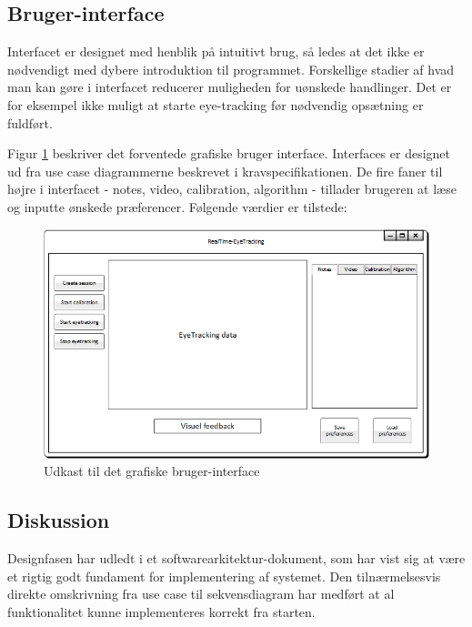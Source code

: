 \documentclass[rapport.tex]{subfiles}
\begin{document}
	\subsection{Bruger-interface}
	Interfacet er designet med henblik på intuitivt brug, så ledes at det ikke er nødvendigt med dybere introduktion til programmet. Forskellige stadier af hvad man kan gøre i interfacet reducerer muligheden for uønskede handlinger. Det er for eksempel ikke muligt at starte eye-tracking før nødvendig opsætning er fuldført. 
	
	Figur \ref{fig:FrameworkUdkastSimpel} beskriver det forventede grafiske bruger interface. Interfaces er designet ud fra use case diagrammerne beskrevet i kravspecifikationen.
	De fire faner til højre i interfacet - notes, video, calibration, algorithm - tillader brugeren at læse og inputte ønskede præferencer. Følgende værdier er tilstede:
	
	
	\begin{figure}
		\centering
		\includegraphics[width=0.9\linewidth]{FrameworkUdkastSimpel}
		\caption[Udkast til GUI]{Udkast til det grafiske bruger-interface}
		\label{fig:FrameworkUdkastSimpel}
	\end{figure}
	
	\subsection{Diskussion}
	Designfasen har udledt i et softwarearkitektur-dokument, som har vist sig at være et rigtig godt fundament for implementering af systemet. Den tilnærmelsesvis direkte omskrivning fra use case til sekvensdiagram har medført at al funktionalitet kunne implementeres korrekt fra starten. 
	
\end{document}
